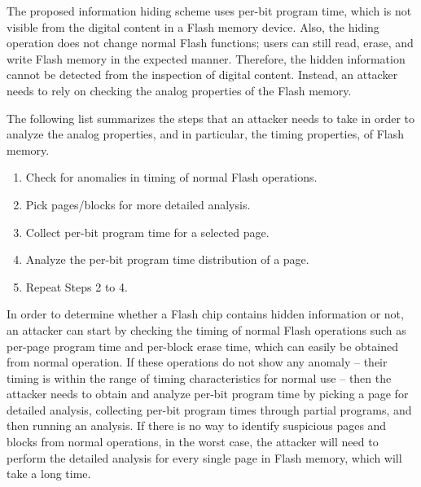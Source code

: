 The proposed information hiding scheme uses per-bit program time,
which is not visible from the digital content 
in a Flash memory device. Also, the hiding 
operation does not change normal Flash
functions; users can still read, erase, and write Flash memory
in the expected manner.
Therefore, the hidden information cannot be detected from the 
inspection of digital content. Instead, an attacker 
needs to rely on checking the analog properties of the Flash memory.

The following list summarizes the steps that an attacker needs to 
take in order to analyze the analog properties, and in particular, 
the timing properties, of Flash memory.

\begin{enumerate}
\item Check for anomalies in timing of normal Flash operations. 

\item Pick pages/blocks for more detailed analysis.

\item Collect per-bit program time for a selected page.

\item Analyze the per-bit program time distribution of a page.

\item Repeat Steps 2 to 4.

\end{enumerate}

In order to determine whether a Flash chip contains hidden information or not,
an attacker can start by checking the timing of normal Flash operations such as
per-page program time and per-block erase time, which can easily be obtained 
from normal operation. If these operations do 
not show any anomaly -- their timing is within the range of timing 
characteristics for normal use -- then the
attacker needs to obtain and analyze per-bit program time by picking a page for
detailed analysis, collecting per-bit program times through partial programs,
and
then running an analysis. If there is no way to identify suspicious pages and blocks
from normal operations, in the worst case,
the attacker will need to perform the detailed analysis for every single page in Flash 
memory, which will take a long time.


